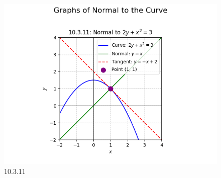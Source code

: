 \documentclass[journal]{IEEEtran}
\begin{document}
\begin{figure}
    \centering
    \includegraphics[width=0.85\columnwidth]{figs/graph-17.png}
    \caption{10.3.11}
    \label{fig:placeholder}
\end{figure}
\end{document}
